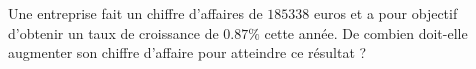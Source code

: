 
\begin{exercice}\label{exosmath-0230}

Une entreprise fait un chiffre d'affaires de $185338$ euros et a pour objectif d'obtenir un taux de croissance de $0.87\%$ cette année. De combien doit-elle augmenter son chiffre d'affaire pour atteindre ce résultat ?

\end{exercice}
